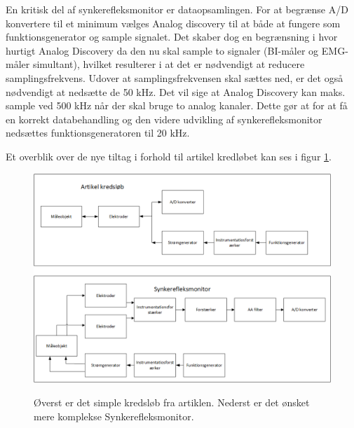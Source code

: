 En kritisk del af synkerefleksmonitor er dataopsamlingen. For at begrænse A/D konvertere til et minimum vælges Analog discovery til at både at fungere som funktionsgenerator og sample signalet. Det skaber dog en begrænsning i hvor hurtigt Analog Discovery da den nu skal sample to signaler (BI-måler og EMG-måler simultant), hvilket resulterer i at det er nødvendigt at reducere samplingsfrekvens. Udover at samplingsfrekvensen skal sættes ned, er det også nødvendigt at nedsætte de 50 kHz. Det vil sige at Analog Discovery kan maks. sample ved 500 kHz når der skal bruge to analog kanaler. Dette gør at for at få en korrekt databehandling og den videre udvikling af synkerefleksmonitor nedsættes funktionsgeneratoren til 20 kHz.

Et overblik over de nye tiltag i forhold til artikel kredløbet kan ses i figur \ref{fig:konklusiondiagram}. 



\begin{figure}[H]
\centering
{\includegraphics[width=\linewidth]
{Figure/konklusiondiagram}}
\caption{Øverst er det simple kredsløb fra artiklen. Nederst er det ønsket mere komplekse Synkerefleksmonitor.}
\label{fig:konklusiondiagram}
\end{figure}









